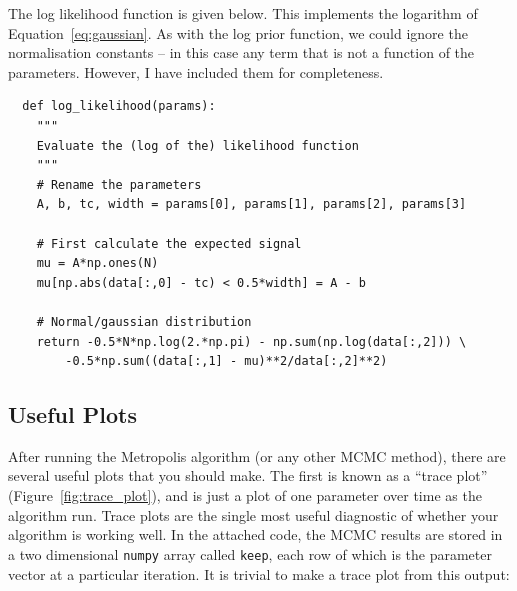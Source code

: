 The log likelihood function is given below. This implements the logarithm of
Equation~\ref{eq:gaussian}. As with the log prior function, we could ignore the
normalisation constants -- in this case any term that is not a function of the
parameters. However, I have included them for completeness.

\begin{verbatim}
  def log_likelihood(params):
    """
    Evaluate the (log of the) likelihood function
    """
    # Rename the parameters
    A, b, tc, width = params[0], params[1], params[2], params[3]

    # First calculate the expected signal
    mu = A*np.ones(N)
    mu[np.abs(data[:,0] - tc) < 0.5*width] = A - b

    # Normal/gaussian distribution
    return -0.5*N*np.log(2.*np.pi) - np.sum(np.log(data[:,2])) \
        -0.5*np.sum((data[:,1] - mu)**2/data[:,2]**2)
\end{verbatim}

\subsection{Useful Plots}
After running the Metropolis algorithm (or any other MCMC method), there are
several useful plots that you should make. The first is known as a
``trace plot'' (Figure~\ref{fig:trace_plot}),
and is just a plot of one parameter over time as the algorithm run. Trace plots
are the single most useful diagnostic of whether your algorithm is working well.
In the attached code, the MCMC results are stored in a two dimensional
{\tt numpy} array called {\tt keep}, each row of which is the parameter vector
at a particular iteration. It is trivial to make a trace plot from this output:

